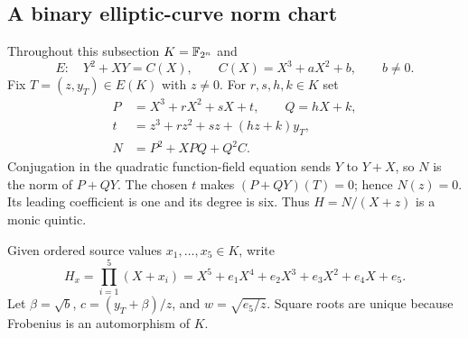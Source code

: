 \subsection{A binary elliptic-curve norm chart}
Throughout this subsection $K=\mathbb F_{2^n}$ and
\[
 E:\quad Y^2+XY=C(X),\qquad C(X)=X^3+aX^2+b,\qquad b\ne0.
\]
Fix $T=(z,y_T)\in E(K)$ with $z\ne0$. For $r,s,h,k\in K$ set
\begin{equation}
 \begin{split}
 P&=X^3+rX^2+sX+t,\qquad Q=hX+k,\\
 t&=z^3+rz^2+sz+(hz+k)y_T,\\
 N&=P^2+XPQ+Q^2C .
 \end{split}
\end{equation}
Conjugation in the quadratic function-field equation sends $Y$ to $Y+X$,
so $N$ is the norm of $P+QY$. The chosen $t$ makes $(P+QY)(T)=0$;
hence $N(z)=0$. Its leading coefficient is one and its degree is six.
Thus $H=N/(X+z)$ is a monic quintic.

Given ordered source values $x_1,\ldots,x_5\in K$, write
\[
 H_x=\prod_{i=1}^5(X+x_i)
     =X^5+e_1X^4+e_2X^3+e_3X^2+e_4X+e_5.
\]
Let $\beta=\sqrt b$, $c=(y_T+\beta)/z$, and $w=\sqrt{e_5/z}$.
Square roots are unique because Frobenius is an automorphism of $K$.

